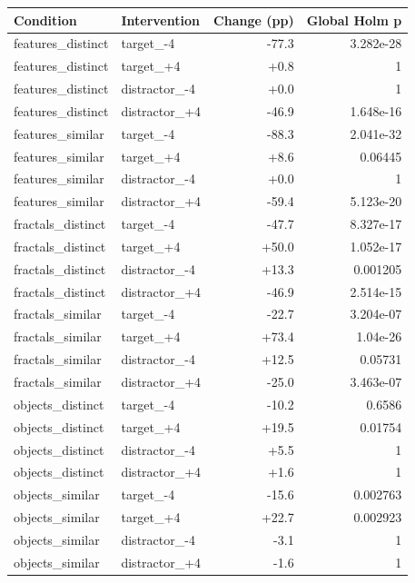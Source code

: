 \documentclass[11pt]{article}
\begin{document}
\small\begin{longtable}{p{}p{}rr}\toprule Condition & Intervention & Change (pp) & Global Holm p\\\midrule\endhead
features\_\allowbreak{}distinct & target\_\allowbreak{}-4 & -77.3 & 3.282e-28\\
features\_\allowbreak{}distinct & target\_\allowbreak{}+4 & +0.8 & 1\\
features\_\allowbreak{}distinct & distractor\_\allowbreak{}-4 & +0.0 & 1\\
features\_\allowbreak{}distinct & distractor\_\allowbreak{}+4 & -46.9 & 1.648e-16\\
features\_\allowbreak{}similar & target\_\allowbreak{}-4 & -88.3 & 2.041e-32\\
features\_\allowbreak{}similar & target\_\allowbreak{}+4 & +8.6 & 0.06445\\
features\_\allowbreak{}similar & distractor\_\allowbreak{}-4 & +0.0 & 1\\
features\_\allowbreak{}similar & distractor\_\allowbreak{}+4 & -59.4 & 5.123e-20\\
fractals\_\allowbreak{}distinct & target\_\allowbreak{}-4 & -47.7 & 8.327e-17\\
fractals\_\allowbreak{}distinct & target\_\allowbreak{}+4 & +50.0 & 1.052e-17\\
fractals\_\allowbreak{}distinct & distractor\_\allowbreak{}-4 & +13.3 & 0.001205\\
fractals\_\allowbreak{}distinct & distractor\_\allowbreak{}+4 & -46.9 & 2.514e-15\\
fractals\_\allowbreak{}similar & target\_\allowbreak{}-4 & -22.7 & 3.204e-07\\
fractals\_\allowbreak{}similar & target\_\allowbreak{}+4 & +73.4 & 1.04e-26\\
fractals\_\allowbreak{}similar & distractor\_\allowbreak{}-4 & +12.5 & 0.05731\\
fractals\_\allowbreak{}similar & distractor\_\allowbreak{}+4 & -25.0 & 3.463e-07\\
objects\_\allowbreak{}distinct & target\_\allowbreak{}-4 & -10.2 & 0.6586\\
objects\_\allowbreak{}distinct & target\_\allowbreak{}+4 & +19.5 & 0.01754\\
objects\_\allowbreak{}distinct & distractor\_\allowbreak{}-4 & +5.5 & 1\\
objects\_\allowbreak{}distinct & distractor\_\allowbreak{}+4 & +1.6 & 1\\
objects\_\allowbreak{}similar & target\_\allowbreak{}-4 & -15.6 & 0.002763\\
objects\_\allowbreak{}similar & target\_\allowbreak{}+4 & +22.7 & 0.002923\\
objects\_\allowbreak{}similar & distractor\_\allowbreak{}-4 & -3.1 & 1\\
objects\_\allowbreak{}similar & distractor\_\allowbreak{}+4 & -1.6 & 1\\
\bottomrule\end{longtable}\normalsize
\end{document}
